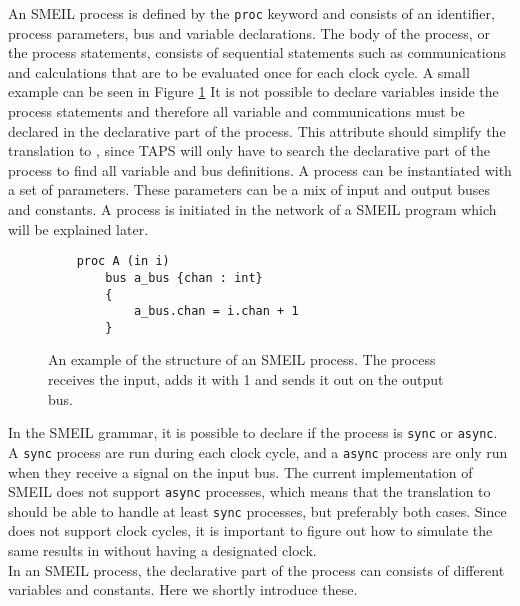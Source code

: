 An SMEIL process is defined by the \texttt{proc} keyword and consists of an identifier, process parameters, bus and variable declarations. The body of the process, or the process statements, consists of sequential statements such as communications and calculations that are to be evaluated once for each clock cycle. A small example can be seen in Figure \ref{fig:small_proc_example_smeil}
It is not possible to declare variables inside the process statements and therefore all variable and communications must be declared in the declarative part of the process. This attribute should simplify the translation to \cspm, since TAPS will only have to search the declarative part of the process to find all variable and bus definitions.
A process can be instantiated with a set of parameters. These parameters can be a mix of input and output buses and constants. A process is initiated in the network of a SMEIL program which will be explained later.
\begin{figure}
    \begin{verbatim}
    proc A (in i)
        bus a_bus {chan : int}
        {
            a_bus.chan = i.chan + 1
        }
    \end{verbatim}
    \caption{An example of the structure of an SMEIL process. The process receives the input, adds it with 1 and sends it out on the output bus.}
    \label{fig:small_proc_example_smeil}
\end{figure}


In the SMEIL grammar, it is possible to declare if the process is \texttt{sync} or \texttt{async}. A \texttt{sync} process are run during each clock cycle, and a \texttt{async} process are only run when they receive a signal on the input bus. The current implementation of SMEIL does not support \texttt{async} processes, which means that the translation to \cspm should be able to handle at least \texttt{sync} processes, but preferably both cases. Since \cspm does not support clock cycles, it is important to figure out how to simulate the same results in \cspm without having a designated clock.
\\

In an SMEIL process, the declarative part of the process can consists of different variables and constants. Here we shortly introduce these.
